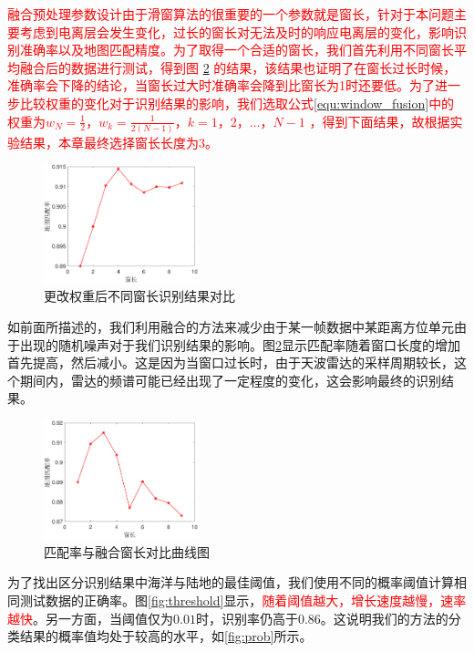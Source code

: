 \textcolor{red}{
融合预处理参数设计由于滑窗算法的很重要的一个参数就是窗长，针对于本问题主要考虑到电离层会发生变化，过长的窗长对无法及时的响应电离层的变化，影响识别准确率以及地图匹配精度。为了取得一个合适的窗长，我们首先利用不同窗长平均融合后的数据进行测试，得到图 \ref{fig:window} 的结果，该结果也证明了在窗长过长时候，准确率会下降的结论，当窗长过大时准确率会降到比窗长为1时还要低。为了进一步比较权重的变化对于识别结果的影响，我们选取公式\ref{equ:window_fusion}中的权重为$w_N=\frac{1}{2}，w_k=\frac{1}{2(N-1)}，k=1，2，\dots，N-1$
，得到下面结果，故根据实验结果，本章最终选择窗长长度为3。
}

\begin{figure}[H]
	\centering
	\includegraphics[width=0.4\textwidth]{figures/othr/weighted_window}
	\caption{更改权重后不同窗长识别结果对比}
	\label{fig:weighted_window}
\end{figure}

如前面所描述的，我们利用融合的方法来减少由于某一帧数据中某距离方位单元由于出现的随机噪声对于我们识别结果的影响。图\ref{fig:window}显示匹配率随着窗口长度的增加首先提高，然后减小。这是因为当窗口过长时，由于天波雷达的采样周期较长，这个期间内，雷达的频谱可能已经出现了一定程度的变化，这会影响最终的识别结果。
\begin{figure}[H]
	\centering
	\includegraphics[width=0.4\textwidth]{figures/othr/window}
	\caption{匹配率与融合窗长对比曲线图}
	\label{fig:window}
\end{figure}
为了找出区分识别结果中海洋与陆地的最佳阈值，我们使用不同的概率阈值计算相同测试数据的正确率。图\ref{fig:threshold}显示，\textcolor{red}{随着阈值越大，增长速度越慢，速率越快}。另一方面，当阈值仅为$0.01$时，识别率仍高于$0.86$。这说明我们的方法的分类结果的概率值均处于较高的水平，如\ref{fig:prob}所示。

